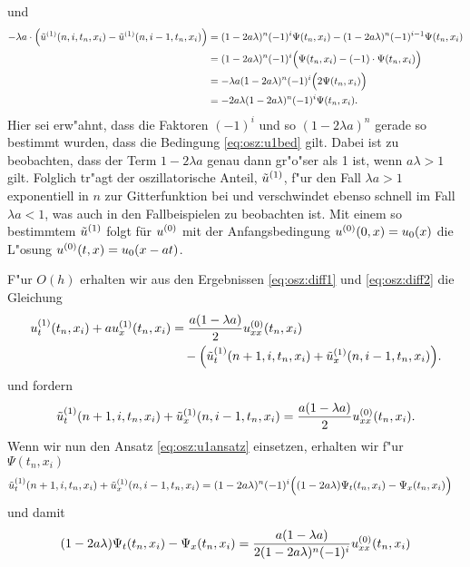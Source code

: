 und
\begin{align*}
- \lambda a \cdot \Bigl( \tilde u^{(1)}(n, i, t_n, x_i) - \tilde u^{(1)}(n, i-1, t_n, x_i) \Bigr)
&= (1 - 2 a \lambda)^n (-1)^i \Psi(t_n, x_i) - (1 - 2 a \lambda)^n (-1)^{i-1} \Psi(t_n, x_i)\\
&= (1 - 2 a \lambda)^n (-1)^i \Bigl( \Psi(t_n, x_i) - (-1) \cdot \Psi(t_n, x_i) \Bigr)\\
&= - \lambda a (1 - 2 a \lambda)^n (-1)^i \Bigl( 2 \Psi(t_n, x_i) \Bigr)\\
&= - 2 a \lambda (1 - 2 a \lambda)^n (-1)^i \Psi(t_n, x_i).
\end{align*}
Hier sei erw"ahnt, dass die Faktoren $(-1)^i$ und so $(1 - 2 \lambda a)^n$ gerade so bestimmt wurden, dass die Bedingung \eqref{eq:osz:u1bed} gilt.
Dabei ist zu beobachten, dass der Term $1 - 2 \lambda a$ genau dann gr"o"ser als 1 ist, wenn $a \lambda > 1$ gilt.
Folglich tr"agt der oszillatorische Anteil, $\tilde u^{(1)}$, f"ur den Fall $\lambda a > 1$ exponentiell in $n$ zur Gitterfunktion bei und verschwindet ebenso schnell im Fall $\lambda a < 1$, was auch in den Fallbeispielen zu beobachten ist.
Mit einem so bestimmtem $\tilde u^{(1)}$ folgt für $u^{(0)}$ mit der Anfangsbedingung $u^{(0)}(0,x) = u_0(x)$ die L"osung $u^{(0)}(t,x) = u_0(x - at)$.

F"ur $O(h)$ erhalten wir aus den Ergebnissen \eqref{eq:osz:diff1} und \eqref{eq:osz:diff2} die Gleichung
\begin{align}
u^{(1)}_t(t_n, x_i) + a u^{(1)}_x(t_n, x_i) &= \frac {a ( 1 - \lambda a )}2 u^{(0)}_{xx}(t_n, x_i)\\
&\quad - \Bigl( \tilde u^{(1)}_{t}(n+1, i, t_n, x_i) + \tilde u^{(1)}_{x}(n, i-1, t_n, x_i) \Bigr).
\end{align}
und fordern
\begin{align*}
\tilde u^{(1)}_{t}(n+1, i, t_n, x_i) + \tilde u^{(1)}_{x}(n, i-1, t_n, x_i) = \frac {a ( 1 - \lambda a )}2 u^{(0)}_{xx}(t_n, x_i).
\end{align*}
Wenn wir nun den Ansatz \eqref{eq:osz:u1ansatz} einsetzen, erhalten wir f"ur $\Psi(t_n, x_i)$
{\small
\begin{align}
\tilde u^{(1)}_{t}(n+1, i, t_n, x_i) + \tilde u^{(1)}_{x}(n, i-1, t_n, x_i)
&= (1 - 2a \lambda)^n (-1)^i \Bigl( (1 - 2a \lambda) \Psi_t(t_n, x_i) - \Psi_x(t_n, x_i) \Bigr)
\end{align}
} und damit
\begin{align}
(1 - 2a \lambda) \Psi_t(t_n, x_i) - \Psi_x(t_n, x_i) = \frac {a (1 - \lambda a)}{2 (1 - 2a \lambda)^n (-1)^i} u^{(0)}_{xx}(t_n, x_i)
\end{align}

